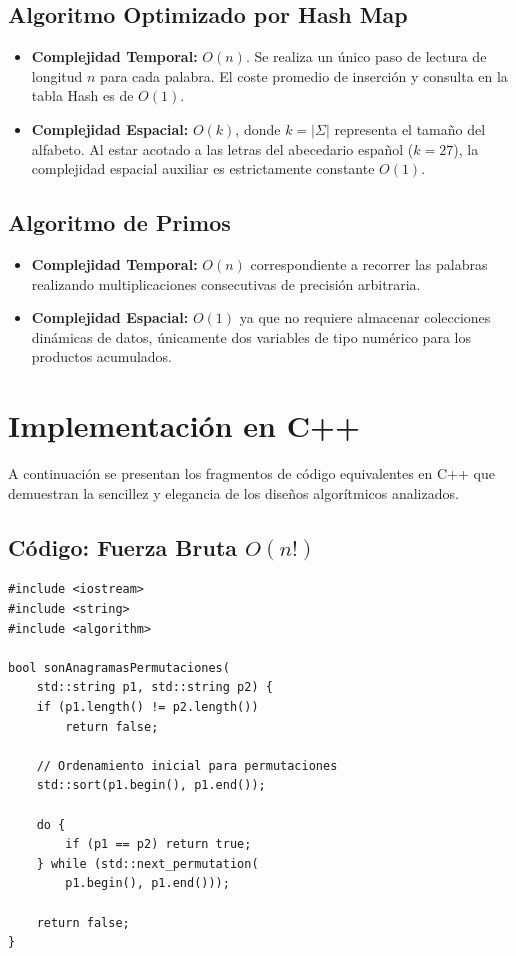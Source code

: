 \documentclass[twocolumn]{article}
\begin{document}
\subsection{Algoritmo Optimizado por Hash Map}
\begin{itemize}
    \item \textbf{Complejidad Temporal:} $O(n)$. Se realiza un único paso de lectura de longitud $n$ para cada palabra. El coste promedio de inserción y consulta en la tabla Hash es de $O(1)$.
    \item \textbf{Complejidad Espacial:} $O(k)$, donde $k = |\Sigma|$ representa el tamaño del alfabeto. Al estar acotado a las letras del abecedario español ($k = 27$), la complejidad espacial auxiliar es estrictamente constante $O(1)$.
\end{itemize}

\subsection{Algoritmo de Primos}
\begin{itemize}
    \item \textbf{Complejidad Temporal:} $O(n)$ correspondiente a recorrer las palabras realizando multiplicaciones consecutivas de precisión arbitraria.
    \item \textbf{Complejidad Espacial:} $O(1)$ ya que no requiere almacenar colecciones dinámicas de datos, únicamente dos variables de tipo numérico para los productos acumulados.
\end{itemize}

\section{Implementación en C++}
A continuación se presentan los fragmentos de código equivalentes en C++ que demuestran la sencillez y elegancia de los diseños algorítmicos analizados.

\subsection{Código: Fuerza Bruta $O(n!)$}
\begin{verbatim}
#include <iostream>
#include <string>
#include <algorithm>

bool sonAnagramasPermutaciones(
    std::string p1, std::string p2) {
    if (p1.length() != p2.length()) 
        return false;
    
    // Ordenamiento inicial para permutaciones
    std::sort(p1.begin(), p1.end());
    
    do {
        if (p1 == p2) return true;
    } while (std::next_permutation(
        p1.begin(), p1.end()));
        
    return false;
}
\end{verbatim}
\end{document}
